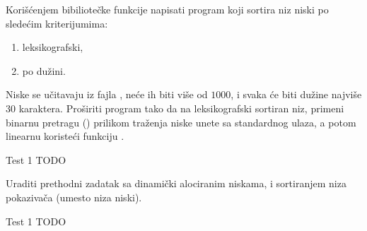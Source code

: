 \begin{Exercise}[label=518]
   Korišćenjem bibiliotečke funkcije  napisati program
   koji sortira niz niski po sledećim kriterijumima:
   \begin{enumerate}
   \item leksikografski,
   \item po dužini.
   \end{enumerate}
   Niske se učitavaju iz fajla , neće ih biti više od
   $1000$, i svaka će biti dužine najviše $30$ karaktera. Proširiti program tako da
   na leksikografski sortiran niz, primeni binarnu pretragu
   () prilikom traženja niske unete sa standardnog
   ulaza, a potom linearnu koristeći funkciju .
\begin{miditest}
\begin{test}{Test 1}
TODO
\end{test}
\end{miditest}
  
\end{Exercise}

\begin{Exercise}[label=519]
  Uraditi prethodni zadatak sa dinamički alociranim niskama, i
  sortiranjem niza pokazivača (umesto niza niski).
  
\begin{miditest}
\begin{test}{Test 1}
TODO
\end{test}
\end{miditest}
  
\end{Exercise}

